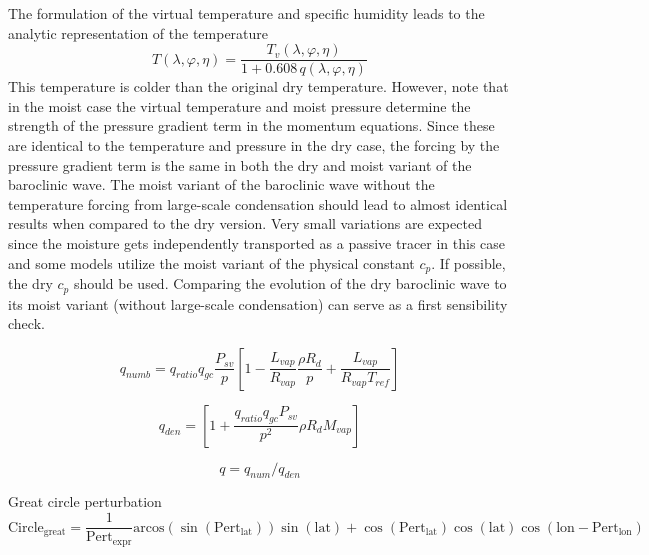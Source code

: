 \documentclass[times,doublespace]{fldauth}
\begin{document}
The formulation of the virtual temperature and specific humidity leads to the analytic representation of the temperature
\begin{equation}
\label{test42:T}
T(\lambda,\varphi,\eta) = \frac{T_v(\lambda,\varphi,\eta)}{1+0.608 \,q(\lambda, \varphi, \eta)}
\end{equation}
This temperature is colder than the original dry temperature. However, note that in the moist case the virtual temperature and moist pressure determine the strength of the pressure gradient term in the momentum equations. Since these are identical to the temperature and pressure in the dry case, the forcing by the pressure gradient term is the same in both the dry and moist variant of the baroclinic wave. The moist variant of the baroclinic wave without the temperature forcing from large-scale condensation should lead to almost identical results when compared to the dry version. Very small variations are expected since the moisture gets independently transported as a passive tracer in this case and some models utilize the moist variant of the physical constant $c_p$. If possible, the dry $c_p$ should be used. Comparing the evolution of the dry baroclinic wave to its moist variant (without large-scale condensation) can serve as a first sensibility check.



\begin{equation}
 q_{numb}=q_{ratio}q_{gc}\frac{P_{sv}}{p}\left[1-\frac{L_{vap}}{R_{vap}}\frac{\rho R_d}{p} + \frac{L_{vap}}{R_{vap} T_{ref}} \right]
\end{equation}

\begin{equation}
 q_{den}=\left[1+\frac{q_{ratio}q_{gc}P_{sv}}{p^2}\rho R_d M_{vap} \right]
\end{equation}

\begin{equation}
 q=q_{num}/q_{den}
\end{equation}

Great circle perturbation \\
\begin{equation*}
\text{Circle}_{\text{great}}=\frac{1}{\text{Pert}_{\text{expr}}}\text{arcos}(\sin(\text{Pert}_{\text{lat}}))\sin(\text{lat})+\cos(\text{Pert}_{\text{lat}})\cos(\text{lat})\cos(\text{lon}-\text{Pert}_{\text{lon}})
\end{equation*}


\clearpage 
\end{document}
